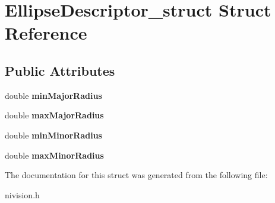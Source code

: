 \hypertarget{structEllipseDescriptor__struct}{\section{\-Ellipse\-Descriptor\-\_\-struct \-Struct \-Reference}
\label{structEllipseDescriptor__struct}
}
\subsection*{\-Public \-Attributes}
\begin{DoxyCompactItemize}
\item 
\hypertarget{structEllipseDescriptor__struct_a95e509054d0a8dd85837d51193c70d36}{double {\bfseries min\-Major\-Radius}}\label{structEllipseDescriptor__struct_a95e509054d0a8dd85837d51193c70d36}

\item 
\hypertarget{structEllipseDescriptor__struct_a234c90ed0d9cdb54e384a284fe0128ad}{double {\bfseries max\-Major\-Radius}}\label{structEllipseDescriptor__struct_a234c90ed0d9cdb54e384a284fe0128ad}

\item 
\hypertarget{structEllipseDescriptor__struct_ae79345156a3c9bb5846bd93a88fa22d6}{double {\bfseries min\-Minor\-Radius}}\label{structEllipseDescriptor__struct_ae79345156a3c9bb5846bd93a88fa22d6}

\item 
\hypertarget{structEllipseDescriptor__struct_aadc00a86dd36647798f8a39bbfb26eb4}{double {\bfseries max\-Minor\-Radius}}\label{structEllipseDescriptor__struct_aadc00a86dd36647798f8a39bbfb26eb4}

\end{DoxyCompactItemize}


\-The documentation for this struct was generated from the following file\-:\begin{DoxyCompactItemize}
\item 
nivision.\-h\end{DoxyCompactItemize}

